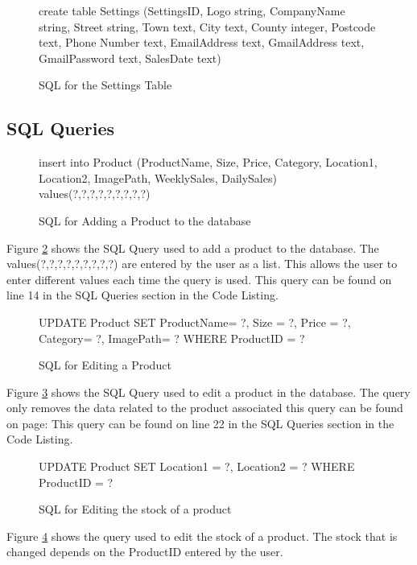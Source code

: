 \begin{figure}[H]
	 \caption{SQL for the Settings Table} \label{fig:settings-sql}
	\begin{sql}
	create table Settings
              (SettingsID,
              Logo string,
              CompanyName string,
              Street string,
              Town text,
              City text,
              County integer,
              Postcode text,
              Phone Number text,
              EmailAddress text,
              GmailAddress text,
              GmailPassword text,
              SalesDate text)
	\end{sql}
\end{figure}

\pagebreak
\subsection{SQL Queries}

\begin{figure}[H]
 \caption{SQL for Adding a Product to the database} \label{fig:add-product-sql}
	\begin{sql}
insert into Product (ProductName, Size, Price, Category, Location1, Location2, ImagePath, WeeklySales, DailySales) values(?,?,?,?,?,?,?,?,?)
	\end{sql}
\end{figure}

Figure \ref{fig:add-product-sql} shows the SQL Query used to add a product to the database. The values(?,?,?,?,?,?,?,?,?) are entered by the user as a list. This allows the user to enter different values each time the query is used. This query can be found on line 14 in the SQL Queries section in the Code Listing.

\begin{figure}[H]
	 \caption{SQL for Editing a Product} \label{fig:edit-product-sql}
\begin{sql} 
UPDATE Product SET ProductName= ?,  Size = ?,  Price = ?, Category= ?, ImagePath= ? WHERE ProductID = ?
 \end{sql}
\end{figure}
Figure \ref{fig:edit-product-sql} shows the SQL Query used to edit a product in the database. The query only removes the data related to the product associated this query can be found on page: This query can be found on line 22 in the SQL Queries section in the Code Listing.


\begin{figure}[H]
	 \caption{SQL for Editing the stock of a product} \label{fig:stock-sql}
\begin{sql} 
UPDATE Product SET Location1 = ?, Location2 = ? WHERE ProductID = ? 
\end{sql}
\end{figure}
Figure \ref{fig:stock-sql} shows the query used to edit the stock of a product. The stock that is changed depends on the ProductID entered by the user.

